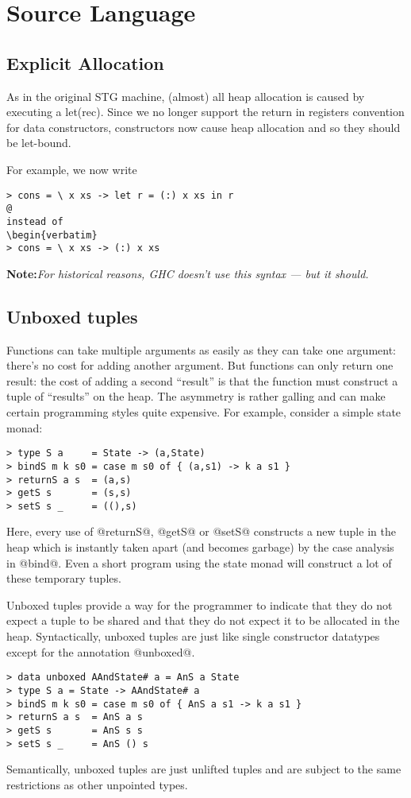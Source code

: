 \documentclass[11pt]{article}
\newcommand{\note}[1]{{{\bf Note:}\sl #1}}
\newcommand{\Section}[2]{\section{#1}\label{sec:#2}}
\newcommand{\Subsection}[2]{\subsection{#1}\label{sec:#2}}
\begin{document}
\Section{Source Language}{source-language}

\Subsection{Explicit Allocation}{explicit-allocation}

As in the original STG machine, (almost) all heap allocation is caused
by executing a let(rec).  Since we no longer support the return in
registers convention for data constructors, constructors now cause heap
allocation and so they should be let-bound.

For example, we now write
\begin{verbatim}
> cons = \ x xs -> let r = (:) x xs in r
@
instead of
\begin{verbatim}
> cons = \ x xs -> (:) x xs
\end{verbatim}

\note{For historical reasons, GHC doesn't use this syntax --- but it should.}

\Subsection{Unboxed tuples}{unboxed-tuples}

Functions can take multiple arguments as easily as they can take one
argument: there's no cost for adding another argument.  But functions
can only return one result: the cost of adding a second ``result'' is
that the function must construct a tuple of ``results'' on the heap.
The asymmetry is rather galling and can make certain programming
styles quite expensive.  For example, consider a simple state
monad:
\begin{verbatim}
> type S a     = State -> (a,State)
> bindS m k s0 = case m s0 of { (a,s1) -> k a s1 }
> returnS a s  = (a,s)
> getS s       = (s,s)
> setS s _     = ((),s)
\end{verbatim}
Here, every use of @returnS@, @getS@ or @setS@ constructs a new tuple
in the heap which is instantly taken apart (and becomes garbage) by
the case analysis in @bind@.  Even a short program using the state monad
will construct a lot of these temporary tuples.

Unboxed tuples provide a way for the programmer to indicate that they
do not expect a tuple to be shared and that they do not expect it to
be allocated in the heap.  Syntactically, unboxed tuples are just like
single constructor datatypes except for the annotation @unboxed@.
\begin{verbatim}
> data unboxed AAndState# a = AnS a State
> type S a = State -> AAndState# a
> bindS m k s0 = case m s0 of { AnS a s1 -> k a s1 }
> returnS a s  = AnS a s
> getS s       = AnS s s
> setS s _     = AnS () s
\end{verbatim}
Semantically, unboxed tuples are just unlifted tuples and are subject
to the same restrictions as other unpointed types.
\end{document}
